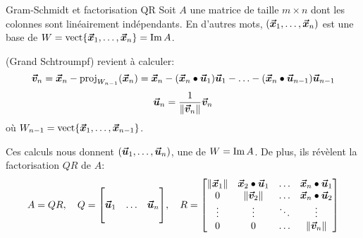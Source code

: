 \documentclass[a4paper]{article}
\begin{document}
\begin{parag}{Gram-Schmidt et factorisation QR}
    Soit $A$ une matrice de taille $m \times n$ dont les colonnes sont linéairement indépendants. En d'autres mots, $\left(\bvec{x}_1, \ldots, \bvec{x}_n\right)$ est une base de $W = \vect\left\{\bvec{x}_1, \ldots, \bvec{x}_n\right\} = \im A$.

     (Grand Schtroumpf) revient à calculer: 
    \[\bvec{v}_n = \bvec{x}_n - \proj_{W_{n-1}}\left(\bvec{x}_n\right) = \bvec{x}_n - \left(\bvec{x}_n \dotprod \bvec{u}_1\right) \bvec{u}_1 - \ldots - \left(\bvec{x}_n \dotprod \bvec{u}_{n-1}\right)\bvec{u}_{n-1}\]
    \[\bvec{u}_n = \frac{1}{\left\|\bvec{v}_n\right\|} \bvec{v}_n\]
    où $W_{n-1} = \vect\left\{\bvec{x}_1, \ldots, \bvec{x}_{n-1}\right\}$.

    Ces calculs nous donnent $\left(\bvec{u}_1, \ldots, \bvec{u}_n\right)$, une  de $W = \operatorname{Im} A$. De plus, ils révèlent la factorisation $QR$ de $A$: 
    \[A = QR, \mathspace Q = \begin{bmatrix}  &  &  \\ \bvec{u}_1 & \ldots & \bvec{u}_n \\  &  &  \end{bmatrix}, \mathspace R = \begin{bmatrix} \left\|\bvec{x}_1\right\| & \bvec{x}_2 \dotprod \bvec{u}_1 & \ldots & \bvec{x}_n \dotprod \bvec{u}_1 \\ 0 & \left\|\bvec{v}_2\right\| & \ldots & \bvec{x}_n \dotprod \bvec{u}_2 \\ \vdots & \vdots & \ddots & \vdots \\ 0 & 0 & \ldots & \left\|\bvec{v}_n\right\| \end{bmatrix} \]
\end{parag}
\end{document}
